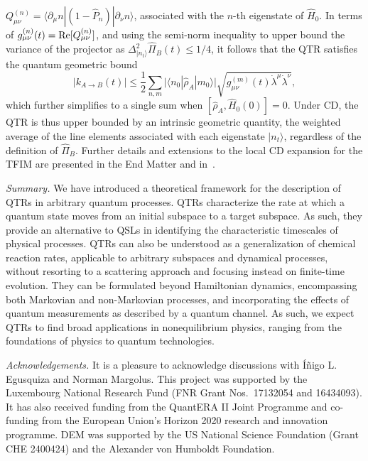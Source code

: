 \documentclass[prl,aps,amssymb,twocolumn,superscriptaddress, notitlepage, longbibliography]{revtex4-2}
\begin{document}
$Q_{\mu\nu}^{(n)}=\langle \partial_{\mu}n|(1-\hat{P}_n)|\partial_{\nu}n\rangle$,
associated with the $n$-th eigenstate of $\hat{H}_0$.
In terms of $g_{\mu\nu}^{(n)}(t)={\rm Re}[Q_{\mu\nu}^{(n)}]$, and using the semi-norm inequality \cite{Boixo07} to upper bound the variance of the projector as $\Delta^2_{|n_t\rangle} \hat\Pi_B(t)\leq 1/4$, it follows that the QTR satisfies the quantum geometric bound
\begin{equation}
|k_{A\rightarrow B}(t)| \leq \frac{1}{2}\sum_{n,m}\lvert\langle n_0|\hat{\rho}_A|m_0\rangle\rvert \sqrt{g_{\mu\nu}^{(m)}(t)\dot{\lambda}^\mu\dot{\lambda}^\nu},
\end{equation}
which further simplifies to a single sum when $\left[\hat{\rho}_A, \hat{H}_0(0)\right] = 0$.
Under CD, the QTR is thus upper bounded by an intrinsic geometric quantity, the weighted average of the line elements associated with each eigenstate $|n_t\rangle$, regardless of the definition of $\hat{\Pi}_B$. Further details and extensions to the local CD expansion for the TFIM are presented in the End Matter and in~\cite{SM}.





{\it Summary.} We have introduced a theoretical framework for the description of QTRs in arbitrary quantum processes. QTRs characterize the rate at which a quantum state moves from an initial subspace to a target subspace. As such,  they provide an alternative to QSLs in identifying the characteristic timescales of physical processes. QTRs can also be understood as a generalization of chemical reaction rates, applicable to arbitrary subspaces and dynamical processes, without resorting to a scattering approach and focusing instead on finite-time evolution.
They can be formulated beyond Hamiltonian dynamics, encompassing both Markovian and non-Markovian processes, and incorporating the effects of quantum measurements as described by a quantum channel.
As such, we expect QTRs to find broad applications in nonequilibrium physics, ranging from the foundations of physics to quantum technologies.

{\it Acknowledgements.} It is a pleasure to acknowledge discussions with \'I\~nigo L. Egusquiza and Norman Margolus.
This project was supported by the Luxembourg National Research Fund (FNR Grant Nos.\ 17132054 and 16434093). It has also received funding from the QuantERA II Joint Programme and co-funding from the European Union’s Horizon 2020 research and innovation programme.  DEM was supported by the US National Science Foundation (Grant CHE 2400424) and the Alexander von Humboldt Foundation.

\newpage
\end{document}
